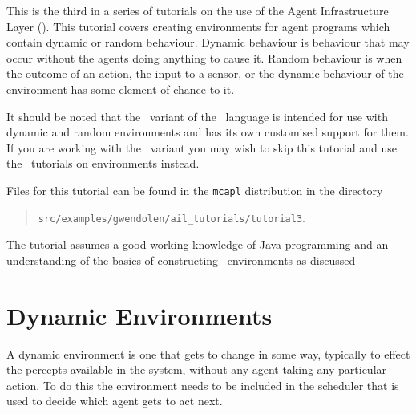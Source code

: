 \label{tutorial:ail:environments}

This is the third in a series of tutorials on the use of the Agent Infrastructure Layer (\ail).  This tutorial covers creating environments for agent programs which contain dynamic or random behaviour.   Dynamic behaviour is behaviour that may occur without the agents doing anything to cause it.  Random behaviour is when the outcome of an action, the input to a sensor, or the dynamic behaviour of the environment has some element of chance to it.

It should be noted that the \eass\ variant of the \gwendolen\ language is intended for use with dynamic and random environments and has its own customised support for them.  If you are working with the \eass\ variant you may wish to skip this tutorial and use the \eass\ tutorials on environments instead.

Files for this tutorial can be found in the \texttt{mcapl} distribution in the directory 
\begin{quote}
\texttt{src/examples/gwendolen/ail\_tutorials/tutorial3}.
\end{quote}

The tutorial assumes a good working knowledge of Java programming and an understanding of the basics of constructing \ail\ environments as discussed 

\section{Dynamic Environments}

A dynamic environment is one that gets to change in some way, typically to effect the percepts available in the system, without any agent taking any particular action.  To do this the environment needs to be included in the scheduler that is used to decide which agent gets to act next.

